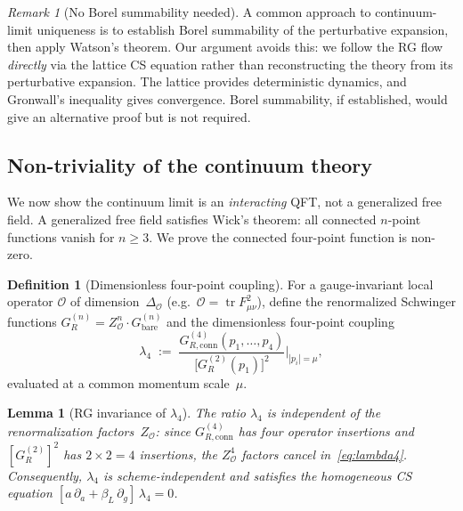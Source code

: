 \documentclass[11pt,a4paper]{article}
\theoremstyle{plain}
\newtheorem{lemma}[theorem]{Lemma}
\theoremstyle{definition}
\newtheorem{definition}[theorem]{Definition}
\theoremstyle{remark}
\newtheorem{remark}[theorem]{Remark}
\newcommand{\tr}{\operatorname{tr}}
\begin{document}
\begin{remark}[No Borel summability needed]
\label{rem:no_borel}
A common approach to continuum-limit uniqueness is to
establish Borel summability of the perturbative expansion,
then apply Watson's theorem.  Our argument avoids this:
we follow the RG flow \emph{directly} via the lattice
CS equation rather than reconstructing the theory from
its perturbative expansion.  The lattice provides
deterministic dynamics, and Gronwall's inequality gives
convergence.  Borel summability, if established, would
give an alternative proof but is not required.
\end{remark}

\subsection{Non-triviality of the continuum theory}

We now show the continuum limit is an \emph{interacting}
QFT, not a generalized free field.  A generalized free
field satisfies Wick's theorem: all connected $n$-point
functions vanish for $n \geq 3$.  We prove the connected
four-point function is non-zero.

\begin{definition}[Dimensionless four-point coupling]
For a gauge-invariant local operator $\mathcal{O}$
of dimension~$\Delta_{\mathcal{O}}$
\textup{(}e.g.\ $\mathcal{O} = \tr F_{\mu\nu}^2$\textup{)},
define the renormalized Schwinger functions
$G_R^{(n)} = Z_{\mathcal{O}}^n \cdot G_{\mathrm{bare}}^{(n)}$
and the dimensionless four-point coupling
\begin{equation}\label{eq:lambda4}
  \lambda_4
  \;:=\; \frac{G_{R,\mathrm{conn}}^{(4)}(p_1,\ldots,p_4)}
  {\bigl[G_R^{(2)}(p_1)\bigr]^2}
  \bigg|_{|p_i| = \mu},
\end{equation}
evaluated at a common momentum scale~$\mu$.
\end{definition}

\begin{lemma}[RG invariance of $\lambda_4$]
\label{lem:lambda4_rg}
The ratio $\lambda_4$ is independent of the
renormalization factors~$Z_{\mathcal{O}}$:
since $G_{R,\mathrm{conn}}^{(4)}$ has four operator
insertions and $[G_R^{(2)}]^2$ has $2 \times 2 = 4$
insertions, the $Z_{\mathcal{O}}^4$ factors cancel
in~\eqref{eq:lambda4}.  Consequently, $\lambda_4$
is scheme-independent and satisfies the homogeneous
CS equation
$[a\,\partial_a + \beta_L\,\partial_g]\,\lambda_4 = 0$.
\end{lemma}
\end{document}
